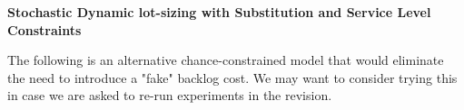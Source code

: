 \documentclass[11pt]{article}
\def\Title#1{\begin{center} {\Large {\bf #1} } \end{center}}
\begin{document}
\Title{Stochastic Dynamic lot-sizing with Substitution and Service Level Constraints }

\bigskip\bigskip










The following is an alternative chance-constrained model that would eliminate the need to introduce a "fake" backlog cost. We may want to consider trying this in case we are asked to re-run experiments in the revision.
\end{document}
